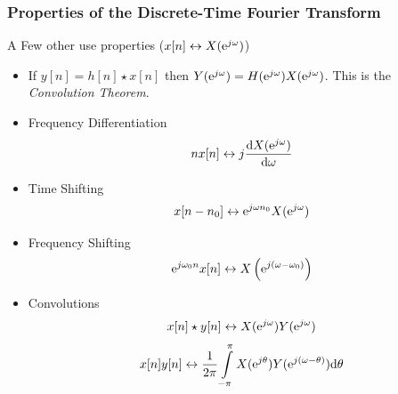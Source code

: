 \documentclass[mathserif,9pt,handout]{beamer}
\def\d{\mathrm{d}}
\begin{document}
\begin{frame}\frametitle{Properties of the Discrete-Time Fourier Transform}\small
  \begin{block}{\small A Few other use properties ($x[n] \leftrightarrow X({\textrm{e}}^{j\omega})$)}
    \begin{itemize}
      \item If $y[n] = h[n] \star x[n]$ then $Y({\textrm{e}}^{j\omega}) = H({\textrm{e}}^{j\omega}) X({\textrm{e}}^{j\omega})$. This is the {\em Convolution Theorem}. 
      \item {\color{blue!50!black}Frequency Differentiation}%
        \begin{align}
          n x[n] \leftrightarrow j \frac{\d X(\e^{j\omega})}{\d\omega}
          \nonumber
        \end{align}
      \item {\color{blue!50!black}Time Shifting}
        \begin{align}
          x[n-n_0] \leftrightarrow {\textrm{e}}^{j\omega n_0} X({\textrm{e}}^{j\omega})
          \nonumber
        \end{align}
      \item {\color{blue!50!black}Frequency Shifting} 
        \begin{align}
          {\textrm{e}}^{j\omega_0 n} x[n] \leftrightarrow  X\left({\textrm{e}}^{j(\omega - \omega_0)}\right)
          \nonumber
        \end{align}
      \item {\color{blue!50!black}Convolutions} 
        \begin{align}
          x[n] \star y[n] \leftrightarrow  X({\textrm{e}}^{j\omega}) Y({\textrm{e}}^{j\omega})  \nonumber
        \end{align}
        \begin{align}
          x[n] y[n] \leftrightarrow  \frac{1}{2\pi}\int\limits_{-\pi}^{\pi} X(\e^{j\theta}) Y(\e^{j(\omega - \theta)})\d\theta \nonumber
          \nonumber
        \end{align}
    \end{itemize}
  \end{block}
\end{frame}
\end{document}
